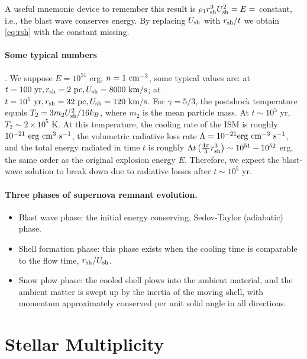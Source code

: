 A useful mnemonic device to remember this result is $\rho_1 r_{\rm sh}^3 U_{\rm sh}^2 = E =$ constant, i.e., the blast wave conserves energy. By replacing $U_{\rm sh}$ with $r_{\rm sh}/t$ we obtain \autoref{eq:rsh} with the constant missing. 

\paragraph{Some typical numbers}. We suppose $E = 10^{51}$ erg,  $n = 1 \ {\rm cm}^{-3}$, some typical values are: at $t=100 \ {\rm yr}, r_{\rm sh} = 2 \ {\rm pc}, U_{\rm sh} = 8000 \ {\rm km/s}$; at $t=10^5 \ {\rm yr}, r_{\rm sh} = 32 \ {\rm pc}, U_{\rm sh} = 120 \ {\rm km/s}$. 
For $\gamma=5/3$, the postshock temperature equals $T_2 = 3 m_2 U_{\rm sh}^2/16 k_B$, where $m_2$ is the mean particle mass. At $t \sim 10^5$ yr, $T_2 \sim 2 \times 10^5$ K. At this temperature, the cooling rate of the ISM is roughly $10^{-21} \ {\rm erg~cm^{3}~s^{-1}}$, the volumetric radiative loss rate $\Lambda = 10^{-21} {\rm erg~cm^{-3}~s^{-1}}$, and the total energy radiated in time $t$ is roughly $\Lambda t \left( \frac{4 \pi}{3} r_{\rm sh}^3 \right) \sim 10^{51} - 10^{52}$  erg, the same order as the original explosion energy $E$. Therefore, we expect the blast-wave solution to break down due to radiative losses after $t \sim 10^5$ yr. 

\paragraph{Three phases of supernova remnant evolution.} 
\begin{itemize}
    \item Blast wave phase: the initial energy conserving, Sedov-Taylor (adiabatic) phase.
    \item Shell formation phase: this phase exists when the cooling time is comparable to the flow time, $r_{\rm sh}/U_{\rm sh}$. 
    \item Snow plow phase: the cooled shell plows into the ambient material, and the ambient matter is swept up by the inertia of the moving shell, with momentum approximately conserved per unit solid angle in all directions. 
\end{itemize}


\section{Stellar Multiplicity}
\label{sec:mul}

